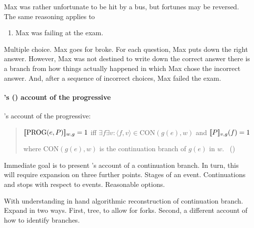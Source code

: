 \begin{note}
  Max was rather unfortunate to be hit by a bus, but fortunes may be reversed.
  The same reasoning applies to

  \begin{enumerate}
  \item
    \label{prog:max:good}
    Max was failing at the exam.
  \end{enumerate}

  Multiple choice.
  Max goes for broke.
  For each question, Max puts down the right answer.
  However, Max was not destined to write down the correct answer there is a branch from how things actually happened in which Max chose the incorrect answer.
  And, after a sequence of incorrect choices, Max failed the exam.
\end{note}

\paragraph[\citeauthor{Landman:1992wh}~(\citeyear{Landman:1992wh})]{\citeauthor{Landman:1992wh}'s (\citeyear{Landman:1992wh}) account of the progressive}

\begin{note}
  \citeauthor{Landman:1992wh}'s account of the progressive:

  \begin{quote}
    \(\sem{\text{PROG}(e, P)}_{w,g} = 1\) iff \(\exists f \exists v\colon \langle f,v \rangle \in \text{CON}(g(e), w)\)\newline
    \phantom{an} and \(\sem{P}_{v,g}(f) = 1\)\par

    where \(\text{CON}(g(e), w)\) is the continuation branch of \(g(e)\) in \(w\).\newline
    \mbox{ }\hfill\mbox{(\citeyear[27]{Landman:1992wh})}
  \end{quote}

  Immediate goal is to present \citeauthor{Landman:1992wh}'s account of a continuation branch.
  In turn, this will require expansion on three further points.
  Stages of an event.
  Continuations and stops with respect to events.
  Reasonable options.

  With understanding in hand algorithmic reconstruction of continuation branch.
  Expand in two ways.
  First, tree, to allow for forks.
  Second, a different account of how to identify branches.
\end{note}

